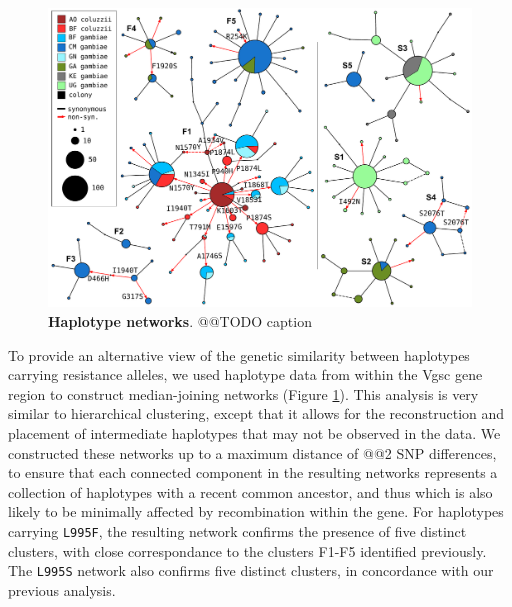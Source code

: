 \documentclass[a4paper,11pt,abstracton,hidelinks]{scrartcl}
\begin{document}
%
\begin{figure}[!b]
  \includegraphics[width=1.1\linewidth,center]{artwork/complete_networks.pdf}
  \caption{\textbf{Haplotype networks}. @@TODO caption}
  \label{fig:networks}
\end{figure}


%
To provide an alternative view of the genetic similarity between haplotypes carrying resistance alleles, we used haplotype data from within the Vgsc gene region to construct median-joining networks (Figure \ref{fig:networks}).
%
This analysis is very similar to hierarchical clustering, except that it allows for the reconstruction and placement of intermediate haplotypes that may not be observed in the data.
%
We constructed these networks up to a maximum distance of @@2 SNP differences, to ensure that each connected component in the resulting networks represents a collection of haplotypes with a recent common ancestor, and thus which is also likely to be minimally affected by recombination within the gene.
%
For haplotypes carrying \texttt{L995F}, the resulting network confirms the presence of five distinct clusters, with close correspondance to the clusters F1-F5 identified previously.
%
The \texttt{L995S} network also confirms five distinct clusters, in concordance with our previous analysis.
%
\end{document}
